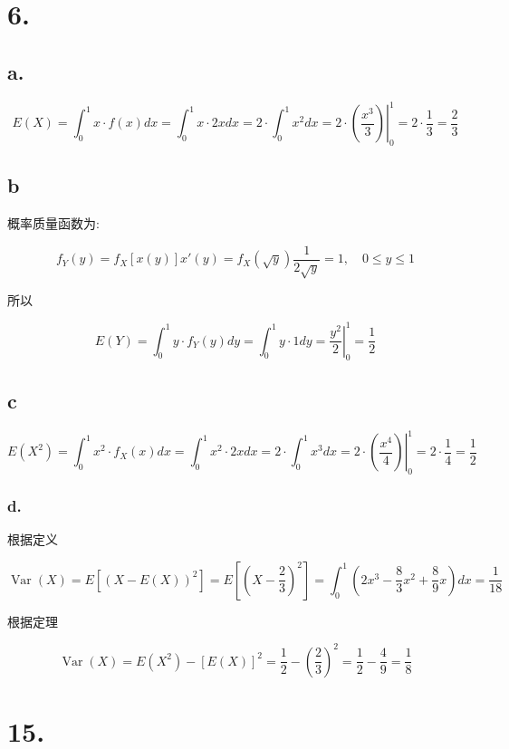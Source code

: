 \documentclass[]{article}
\date{}
\begin{document}
\section{6.}\label{header-n0}

\subsection{a.}\label{header-n2}

\[E(X)=\int_{0}^{1} x \cdot f(x) d x=\int_{0}^{1} x \cdot 2 x d x=2 \cdot \int_{0}^{1} x^{2} d x=\left.2 \cdot\left(\frac{x^{3}}{3}\right)\right|_{0} ^{1}=2 \cdot \frac{1}{3}=\frac{2}{3}\]

\subsection{b}\label{header-n4}

概率质量函数为:

\[f_Y(y)=f_X[x(y)]x'(y)=f_X(\sqrt y)\frac{1}{2\sqrt{y}}=1, \quad 0\le y\le1\]

所以

\[E(Y)=\int_{0}^{1} y \cdot f_{Y}(y) d y=\int_{0}^{1} y \cdot 1 d y=\left.\frac{y^{2}}{2}\right|_{0} ^{1}=\frac{1}{2}\]

\subsection{c}\label{header-n9}

\[E\left(X^{2}\right)=\int_{0}^{1} x^{2} \cdot f_{X}(x) d x=\int_{0}^{1} x^{2} \cdot 2 x d x=2 \cdot \int_{0}^{1} x^{3} d x=\left.2 \cdot\left(\frac{x^{4}}{4}\right)\right|_{0} ^{1}=2 \cdot \frac{1}{4}=\frac{1}{2}\]

\subsubsection{d.}\label{header-n11}

根据定义

\[\operatorname{Var}(X)=E\left[(X-E(X))^{2}\right]=E\left[\left(X-\frac{2}{3}\right)^{2}\right]=\int_{0}^{1}\left(2 x^{3}-\frac{8}{3} x^{2}+\frac{8}{9} x\right) d x=\frac{1}{18}\]

根据定理

\[\operatorname{Var}(X)=E\left(X^{2}\right)-[E(X)]^{2}=\frac{1}{2}-\left(\frac{2}{3}\right)^{2}=\frac{1}{2}-\frac{4}{9}=\frac{1}{8}\]

\section{15.}\label{header-n16}
\end{document}
